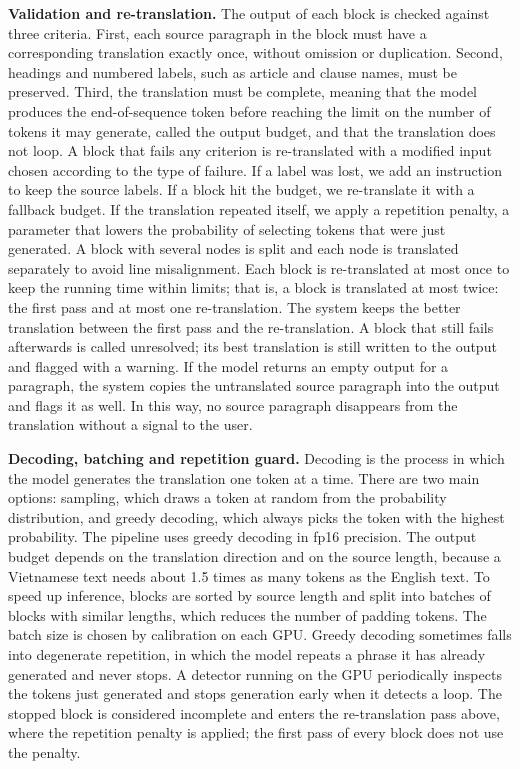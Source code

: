 \documentclass[conference]{IEEEtran}
\begin{document}
\textbf{Validation and re-translation.} The output of each block is checked against three criteria. First, each source paragraph in the block must have a corresponding translation exactly once, without omission or duplication. Second, headings and numbered labels, such as article and clause names, must be preserved. Third, the translation must be complete, meaning that the model produces the end-of-sequence token before reaching the limit on the number of tokens it may generate, called the output budget, and that the translation does not loop. A block that fails any criterion is re-translated with a modified input chosen according to the type of failure. If a label was lost, we add an instruction to keep the source labels. If a block hit the budget, we re-translate it with a fallback budget. If the translation repeated itself, we apply a repetition penalty, a parameter that lowers the probability of selecting tokens that were just generated. A block with several nodes is split and each node is translated separately to avoid line misalignment. Each block is re-translated at most once to keep the running time within limits; that is, a block is translated at most twice: the first pass and at most one re-translation. The system keeps the better translation between the first pass and the re-translation. A block that still fails afterwards is called unresolved; its best translation is still written to the output and flagged with a warning. If the model returns an empty output for a paragraph, the system copies the untranslated source paragraph into the output and flags it as well. In this way, no source paragraph disappears from the translation without a signal to the user.

\textbf{Decoding, batching and repetition guard.} Decoding is the process in which the model generates the translation one token at a time. There are two main options: sampling, which draws a token at random from the probability distribution, and greedy decoding, which always picks the token with the highest probability. The pipeline uses greedy decoding in fp16 precision. The output budget depends on the translation direction and on the source length, because a Vietnamese text needs about 1.5 times as many tokens as the English text. To speed up inference, blocks are sorted by source length and split into batches of blocks with similar lengths, which reduces the number of padding tokens. The batch size is chosen by calibration on each GPU. Greedy decoding sometimes falls into degenerate repetition, in which the model repeats a phrase it has already generated and never stops. A detector running on the GPU periodically inspects the tokens just generated and stops generation early when it detects a loop. The stopped block is considered incomplete and enters the re-translation pass above, where the repetition penalty is applied; the first pass of every block does not use the penalty.
\end{document}
